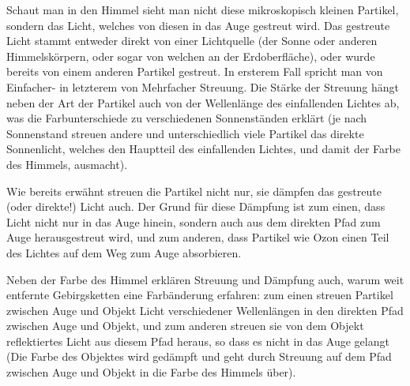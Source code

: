 Schaut man in den Himmel sieht man nicht diese mikroskopisch kleinen Partikel, sondern das Licht, welches von diesen in
das Auge gestreut wird. Das gestreute Licht stammt entweder direkt von einer Lichtquelle (der Sonne oder anderen
Himmelskörpern, oder sogar von welchen an der Erdoberfläche), oder wurde bereits von einem anderen Partikel gestreut. In
ersterem Fall spricht man von Einfacher- in letzterem von Mehrfacher Streuung. Die Stärke der Streuung hängt neben der
Art der Partikel auch von der Wellenlänge des einfallenden Lichtes ab, was die Farbunterschiede zu verschiedenen
Sonnenständen erklärt (je nach Sonnenstand streuen andere und unterschiedlich viele Partikel das direkte Sonnenlicht,
welches den Hauptteil des einfallenden Lichtes, und damit der Farbe des Himmels, ausmacht).

Wie bereits erwähnt streuen die Partikel nicht nur, sie dämpfen das gestreute (oder direkte!) Licht auch. Der Grund für
diese Dämpfung ist zum einen, dass Licht nicht nur in das Auge hinein, sondern auch aus dem direkten Pfad zum Auge
herausgestreut wird, und zum anderen, dass Partikel wie Ozon einen Teil des Lichtes auf dem Weg zum Auge absorbieren.

Neben der Farbe des Himmel erklären Streuung und Dämpfung auch, warum weit entfernte Gebirgsketten eine Farbänderung
erfahren: zum einen streuen Partikel zwischen Auge und Objekt Licht verschiedener Wellenlängen in den direkten Pfad
zwischen Auge und Objekt, und zum anderen streuen sie von dem Objekt reflektiertes Licht aus diesem Pfad heraus, so dass
es nicht in das Auge gelangt (Die Farbe des Objektes wird gedämpft und geht durch Streuung auf dem Pfad zwischen Auge
und Objekt in die Farbe des Himmels über).

